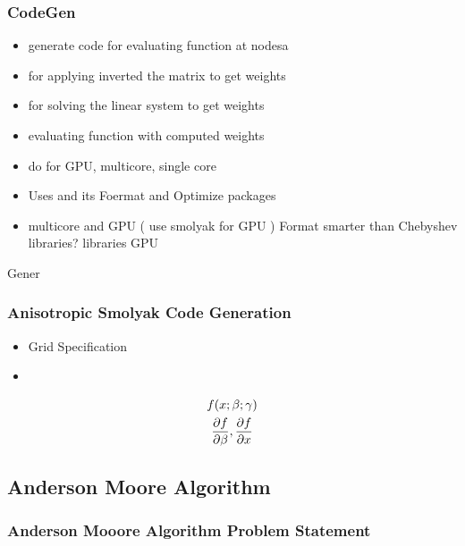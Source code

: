 \documentclass{beamer}
\begin{document}
\begin{frame}
  \frametitle{CodeGen}
  \begin{itemize}
  \item generate code for evaluating function at nodesa
  \item for applying inverted the matrix to get weights 
  \item for solving the linear system to get weights
  \item evaluating function with computed weights
  \item do for GPU, multicore, single core
  \item Uses \mma  and  its Foermat and Optimize packages
\item multicore and GPU ( use smolyak for GPU ) Format smarter than Chebyshev libraries?  libraries GPU
  \end{itemize}
  Gener
\end{frame}



\begin{frame}
  \frametitle{Anisotropic Smolyak Code Generation}
  
  \begin{itemize}
  \item Grid Specification
  \item \mma
  \end{itemize}
  \begin{gather*}
    f(x;\beta;\gamma)\\
\frac{\partial f}{\partial \beta},\frac{\partial f}{\partial x}
  \end{gather*}

\end{frame}


  

  




\subsection{Anderson Moore Algorithm }

  \subsubsection{Anderson Mooore Algorithm Problem Statement}
\end{document}
